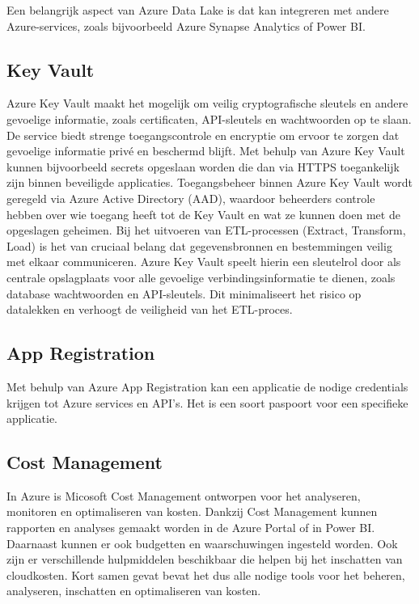 Een belangrijk aspect van Azure Data Lake is dat kan integreren met andere Azure-services, zoals bijvoorbeeld Azure Synapse Analytics of Power BI.

\subsection{Key Vault}

Azure Key Vault maakt het mogelijk om veilig cryptografische sleutels en andere gevoelige informatie, zoals certificaten, API-sleutels en wachtwoorden op te slaan. De service biedt strenge toegangscontrole en encryptie om ervoor te zorgen dat gevoelige informatie privé en beschermd blijft. Met behulp van Azure Key Vault kunnen bijvoorbeeld secrets opgeslaan worden die dan via HTTPS toegankelijk zijn binnen beveiligde applicaties. Toegangsbeheer binnen Azure Key Vault wordt geregeld via Azure Active Directory (AAD), waardoor beheerders controle hebben over wie toegang heeft tot de Key Vault en wat ze kunnen doen met de opgeslagen geheimen. Bij het uitvoeren van ETL-processen (Extract, Transform, Load) is het van cruciaal belang dat gegevensbronnen en bestemmingen veilig met elkaar communiceren. Azure Key Vault speelt hierin een sleutelrol door als centrale opslagplaats voor alle gevoelige verbindingsinformatie te dienen, zoals database wachtwoorden en API-sleutels. Dit minimaliseert het risico op datalekken en verhoogt de veiligheid van het ETL-proces.~\autocite{Microsoft2024g}

\subsection{App Registration}

Met behulp van Azure App Registration kan een applicatie de nodige credentials krijgen tot Azure services en API's. Het is een soort paspoort voor een specifieke applicatie.~\autocite{Anaparthy2023}

\subsection{Cost Management}

In Azure is Micosoft Cost Management ontworpen voor het analyseren, monitoren en optimaliseren van kosten. Dankzij Cost Management kunnen rapporten en analyses gemaakt worden in de Azure Portal of in Power BI. Daarnaast kunnen er ook budgetten en waarschuwingen ingesteld worden. Ook zijn er verschillende hulpmiddelen beschikbaar die helpen bij het inschatten van cloudkosten. Kort samen gevat bevat het dus alle nodige tools voor het beheren, analyseren, inschatten en optimaliseren van kosten.~\autocite{Microsoft2023}

